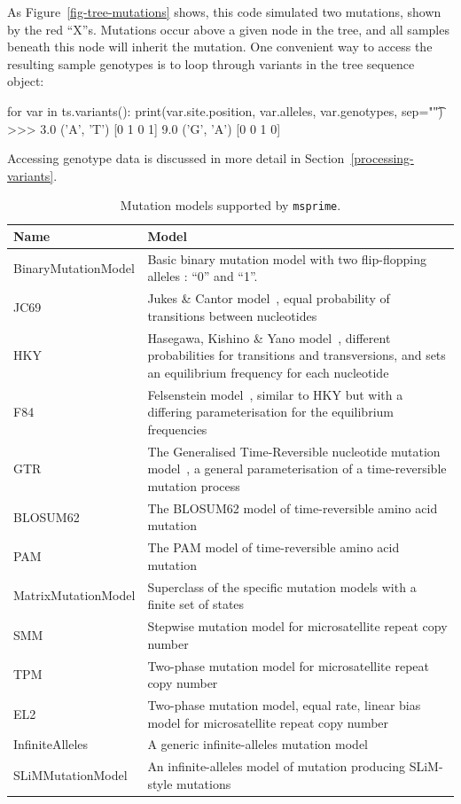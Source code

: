 \documentclass[graybox]{svmult}
\begin{document}
As Figure~\ref{fig-tree-mutations} shows, this code simulated two mutations,
shown by the red ``X''s.
Mutations occur above a given node in the tree, and all samples beneath
this node will inherit the mutation.
One convenient way to access the resulting sample genotypes is to loop through variants in the
tree sequence object:

\begin{pythoncode}
for var in ts.variants():
    print(var.site.position, var.alleles, var.genotypes, sep="\t")
>>> 3.0	('A', 'T')	[0 1 0 1]
    9.0	('G', 'A')	[0 0 1 0]
\end{pythoncode}
Accessing genotype data is discussed in more detail in Section~\ref{processing-variants}.

\begin{table}
\centering
\begin{tabular}{|l|p{8cm}|}
\hline
\textbf{Name} & \textbf{Model} \\
\hline
BinaryMutationModel & Basic binary mutation model with two flip-flopping alleles : “0” and “1”. \\
\hline
JC69 & Jukes \& Cantor model~\citep{jukes1969evolution}, equal probability of transitions between nucleotides \\
\hline
HKY & Hasegawa, Kishino \& Yano model~\citep{hasegawa_1985_dating}, different probabilities for transitions and transversions, and sets an equilibrium frequency for each nucleotide\\
\hline
F84 & Felsenstein model~\citep{felsenstein1996hidden}, similar to HKY but with a differing parameterisation for the equilibrium frequencies \\
\hline
GTR & The Generalised Time-Reversible nucleotide mutation model~\citep{tavare1986some}, a general parameterisation of a time-reversible mutation process \\
\hline
BLOSUM62 & The BLOSUM62 model of time-reversible amino acid mutation~\citep{henikoff1992amino} \\
\hline
PAM & The PAM model of time-reversible amino acid mutation~\citep{dayhoff1978} \\
\hline
MatrixMutationModel & Superclass of the specific mutation models with a finite set of states \\
\hline
SMM & Stepwise mutation model for microsatellite repeat copy number~\citep{kimura_1978_stepwise} \\
\hline
TPM & Two-phase mutation model for microsatellite repeat copy number~\citep{dirienzo_1994_mutational} \\
\hline
EL2 & Two-phase mutation model, equal rate, linear bias model for microsatellite repeat copy number~\citep{garza_1995_microsatellite} \\
\hline
InfiniteAlleles & A generic infinite-alleles mutation model \\
\hline
SLiMMutationModel & An infinite-alleles model of mutation producing SLiM-style mutations \\
\hline
\end{tabular}
\caption{Mutation models supported by \texttt{msprime}.}
\label{tab:mutation-models}
\end{table}
\end{document}
